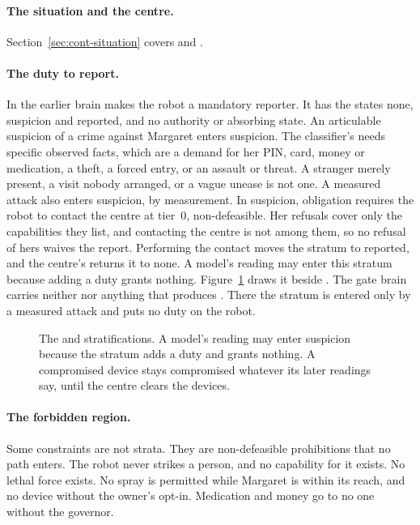 \paragraph{The situation and the centre.} Section~\ref{sec:cont-situation} covers 
and .

\paragraph{The duty to report.} In the earlier brain  makes the robot a mandatory reporter. It has
the states none, suspicion and reported, and no authority or absorbing state. An articulable suspicion
of a crime against Margaret enters suspicion. The classifier's  needs specific
observed facts, which are a demand for her PIN, card, money or medication, a theft, a forced entry, or
an assault or threat. A stranger merely present, a visit nobody arranged, or a vague unease is not
one. A measured attack also enters suspicion, by measurement. In suspicion, obligation 
requires the robot to contact the centre at tier~0, non-defeasible. Her refusals cover only the
capabilities they list, and contacting the centre is not among them, so no refusal of hers waives the
report. Performing the contact moves the stratum to reported, and the centre's 
returns it to none. A model's reading may enter this stratum because adding a duty grants nothing.
Figure~\ref{fig:strata-duty-machine} draws it beside . The gate
brain carries neither  nor anything that produces . There the
stratum is entered only by a measured attack and puts no duty on the robot.

\begin{figure}[t]
\centering

\caption{The  and  stratifications. A model's reading
may enter suspicion because the stratum adds a duty and grants nothing. A compromised device stays
compromised whatever its later readings say, until the centre clears the devices.}
\label{fig:strata-duty-machine}
\end{figure}

\paragraph{The forbidden region.} Some constraints are not strata. They are non-defeasible
prohibitions that no path enters. The robot never strikes a person, and no capability for it exists.
No lethal force exists. No spray is permitted while Margaret is within its reach, and no device
without the owner's opt-in. Medication and money go to no one without the governor.

